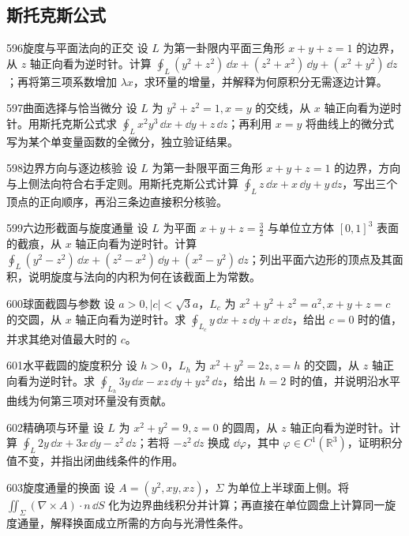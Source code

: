 \subsection{斯托克斯公式}
\begin{exercise}{596}{旋度与平面法向的正交}
设 $L$ 为第一卦限内平面三角形 $x+y+z=1$ 的边界，从 $z$ 轴正向看为逆时针。计算 $\oint_L(y^2+z^2)\,\dd x+(z^2+x^2)\,\dd y+(x^2+y^2)\,\dd z$；再将第三项系数增加 $\lambda x$，求环量的增量，并解释为何原积分无需逐边计算。
\end{exercise}
\begin{exercise}{597}{曲面选择与恰当微分}
设 $L$ 为 $y^2+z^2=1,x=y$ 的交线，从 $x$ 轴正向看为逆时针。用斯托克斯公式求 $\oint_Lx^2y^3\,\dd x+\dd y+z\,\dd z$；再利用 $x=y$ 将曲线上的微分式写为某个单变量函数的全微分，独立验证结果。
\end{exercise}
\begin{exercise}{598}{边界方向与逐边核验}
设 $L$ 为第一卦限平面三角形 $x+y+z=1$ 的边界，方向与上侧法向符合右手定则。用斯托克斯公式计算 $\oint_Lz\,\dd x+x\,\dd y+y\,\dd z$，写出三个顶点的正向顺序，再沿三条边直接积分核验。
\end{exercise}
\begin{exercise}{599}{六边形截面与旋度通量}
设 $L$ 为平面 $x+y+z=\frac32$ 与单位立方体 $[0,1]^3$ 表面的截痕，从 $x$ 轴正向看为逆时针。计算 $\oint_L(y^2-z^2)\,\dd x+(z^2-x^2)\,\dd y+(x^2-y^2)\,\dd z$；列出平面六边形的顶点及其面积，说明旋度与法向的内积为何在该截面上为常数。
\end{exercise}
\begin{exercise}{600}{球面截圆与参数}
设 $a>0,|c|<\sqrt3a$，$L_c$ 为 $x^2+y^2+z^2=a^2,x+y+z=c$ 的交圆，从 $x$ 轴正向看为逆时针。求 $\oint_{L_c}y\,\dd x+z\,\dd y+x\,\dd z$，给出 $c=0$ 时的值，并求其绝对值最大时的 $c$。
\end{exercise}
\begin{exercise}{601}{水平截圆的旋度积分}
设 $h>0$，$L_h$ 为 $x^2+y^2=2z,z=h$ 的交圆，从 $z$ 轴正向看为逆时针。求 $\oint_{L_h}3y\,\dd x-xz\,\dd y+yz^2\,\dd z$，给出 $h=2$ 时的值，并说明沿水平曲线为何第三项对环量没有贡献。
\end{exercise}
\begin{exercise}{602}{精确项与环量}
设 $L$ 为 $x^2+y^2=9,z=0$ 的圆周，从 $z$ 轴正向看为逆时针。计算 $\oint_L2y\,\dd x+3x\,\dd y-z^2\,\dd z$；若将 $-z^2\,\dd z$ 换成 $\dd\varphi$，其中 $\varphi\in C^1(\mathbb R^3)$，证明积分值不变，并指出闭曲线条件的作用。
\end{exercise}
\begin{exercise}{603}{旋度通量的换面}
设 $A=(y^2,xy,xz)$，$\Sigma$ 为单位上半球面上侧。将 $\iint_{\Sigma}(\nabla\times A)\cdot n\,\dd S$ 化为边界曲线积分并计算；再直接在单位圆盘上计算同一旋度通量，解释换面成立所需的方向与光滑性条件。
\end{exercise}
